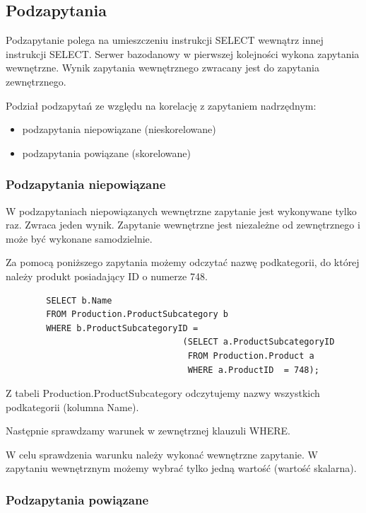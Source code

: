 \documentclass[12pt]{article}
\begin{document}
    \subsection{Podzapytania}
    
    Podzapytanie polega na umieszczeniu instrukcji SELECT wewnątrz innej instrukcji SELECT. Serwer bazodanowy w pierwszej kolejności wykona zapytania wewnętrzne. Wynik zapytania wewnętrznego zwracany jest do zapytania zewnętrznego.
    
    Podział podzapytań ze względu na korelację z zapytaniem nadrzędnym:
    \begin{itemize}
        \item podzapytania niepowiązane (nieskorelowane)
        \item podzapytania powiązane (skorelowane)
    \end{itemize}
    
    \subsubsection{Podzapytania niepowiązane}
    W podzapytaniach niepowiązanych wewnętrzne zapytanie jest wykonywane tylko raz. Zwraca jeden wynik. Zapytanie wewnętrzne jest niezależne od zewnętrznego i może być wykonane samodzielnie.

    Za pomocą poniższego zapytania możemy odczytać nazwę podkategorii, do której należy produkt posiadający ID o numerze 748.
    \begin{verbatim}
        SELECT b.Name
        FROM Production.ProductSubcategory b
        WHERE b.ProductSubcategoryID =
                                   (SELECT a.ProductSubcategoryID
                                    FROM Production.Product a
                                    WHERE a.ProductID  = 748);
    \end{verbatim}
    
    Z tabeli Production.ProductSubcategory odczytujemy nazwy wszystkich podkategorii (kolumna Name).

    Następnie sprawdzamy warunek w zewnętrznej klauzuli WHERE.
    
    W celu sprawdzenia warunku należy wykonać wewnętrzne zapytanie. W zapytaniu wewnętrznym możemy wybrać tylko jedną wartość (wartość skalarna).
    
    \subsubsection{Podzapytania powiązane}
    
\end{document}

